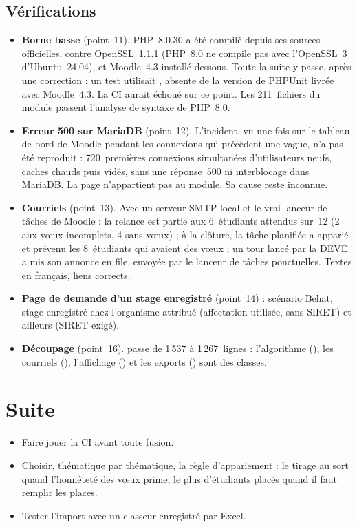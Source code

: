 \documentclass[11pt,a4paper]{article}
\begin{document}
\subsection{Vérifications}

\begin{itemize}
  \item \textbf{Borne basse} (point~11). PHP~8.0.30 a été compilé depuis ses sources officielles,
    contre OpenSSL~1.1.1 (PHP~8.0 ne compile pas avec l'OpenSSL~3 d'Ubuntu~24.04), et Moodle~4.3
    installé dessous. Toute la suite y passe, après une correction : un test utilisait
    , absente de la version de PHPUnit livrée avec Moodle~4.3.
    La CI aurait échoué sur ce point. Les 211~fichiers du module passent l'analyse de syntaxe de
    PHP~8.0.
  \item \textbf{Erreur 500 sur MariaDB} (point~12). L'incident, vu une fois sur le tableau de bord
    de Moodle pendant les connexions qui précèdent une vague, n'a pas été reproduit : 720~premières
    connexions simultanées d'utilisateurs neufs, caches chauds puis vidés, sans une réponse~500
    ni interblocage dans MariaDB. La page n'appartient pas au module. Sa cause reste inconnue.
  \item \textbf{Courriels} (point~13). Avec un serveur SMTP local et le vrai lanceur de tâches de
    Moodle : la relance est partie aux 6~étudiants attendus sur~12 (2 aux vœux incomplets, 4 sans
    vœux) ; à la clôture, la tâche planifiée a apparié et prévenu les 8~étudiants qui avaient des
    vœux ; un tour lancé par la DEVE a mis son annonce en file, envoyée par le lanceur de tâches
    ponctuelles. Textes en français, liens corrects.
  \item \textbf{Page de demande d'un stage enregistré} (point~14) : scénario Behat, stage
    enregistré chez l'organisme attribué (affectation utilisée, sans SIRET) et ailleurs (SIRET
    exigé).
  \item \textbf{Découpage} (point~16).  passe de 1\,537 à 1\,267~lignes :
    l'algorithme (), les courriels (), l'affichage
    () et les exports () sont des classes.
\end{itemize}

\section{Suite}

\begin{itemize}
  \item Faire jouer la CI avant toute fusion.
  \item Choisir, thématique par thématique, la règle d'appariement : le tirage au sort quand
    l'honnêteté des vœux prime, \og le plus d'étudiants placés\fg{} quand il faut remplir les places.
  \item Tester l'import avec un classeur enregistré par Excel.
\end{itemize}
\end{document}
